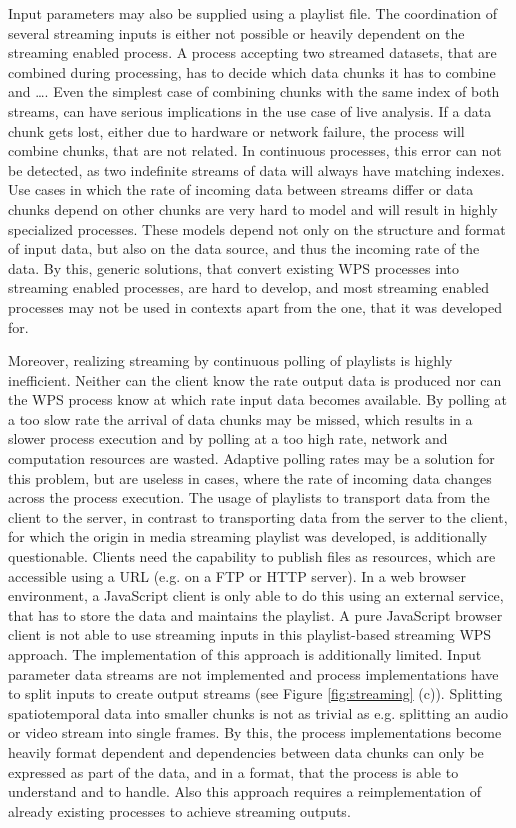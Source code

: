 	Input parameters may also be supplied using a playlist file. The coordination of several streaming inputs is either not possible or heavily dependent on the streaming enabled process. A process accepting two streamed datasets, that are combined during processing, has to decide which data chunks it has to combine and \dots. Even the simplest case of combining chunks with the same index of both streams, can have serious implications in the use case of live analysis. If a data chunk gets lost, either due to hardware or network failure, the process will combine chunks, that are not related. In continuous processes, this error can not be detected, as two indefinite streams of data will always have matching indexes. Use cases in which the rate of incoming data between streams differ or data chunks depend on other chunks are very hard to model and will result in highly specialized processes. These models depend not only on the structure and format of input data, but also on the data source, and thus the incoming rate of the data. By this, generic solutions, that convert existing \ac{WPS} processes into streaming enabled processes, are hard to develop, and most streaming enabled processes may not be used in contexts apart from the one, that it was developed for.

	Moreover, realizing streaming by continuous polling of playlists is highly inefficient. Neither can the client know the rate output data is produced nor can the \ac{WPS} process know at which rate input data becomes available. By polling at a too slow rate the arrival of data chunks may be missed, which results in a slower process execution and by polling at a too high rate, network and computation resources are wasted. Adaptive polling rates may be a solution for this problem, but are useless in cases, where the rate of incoming data changes across the process execution. The usage of playlists to transport data from the client to the server, in contrast to transporting data from the server to the client, for which the origin in media streaming playlist was developed, is additionally questionable. Clients need the capability to publish files as resources, which are accessible using a URL (e.g. on a FTP or HTTP server). In a web browser environment, a JavaScript client is only able to do this using an external service, that has to store the data and maintains the playlist. A pure JavaScript browser client is not able to use streaming inputs in this playlist-based streaming \ac{WPS} approach. The implementation of this approach is additionally limited. Input parameter data streams are not implemented and process implementations have to split inputs to create output streams (see Figure \ref{fig:streaming} (c)). Splitting spatiotemporal data into smaller chunks is not as trivial as e.g. splitting an audio or video stream into single frames. By this, the process implementations become heavily format dependent and dependencies between data chunks can only be expressed as part of the data, and in a format, that the process is able to understand and to handle. Also this approach requires a reimplementation of already existing processes to achieve streaming outputs.


